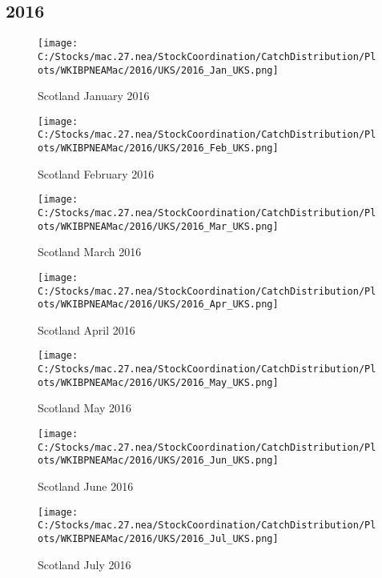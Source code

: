 \documentclass{article}
\begin{document}
\subsection{2016}



\begin{figure}[h]
	\centering
		\texttt{[image: C:/Stocks/mac.27.nea/StockCoordination/CatchDistribution/Plots/WKIBPNEAMac/2016/UKS/2016\_Jan\_UKS.png]}
	\caption{Scotland January 2016}
	\label{fig:2016_Jan_UKS}
\end{figure}

\begin{figure}
	\centering
		\texttt{[image: C:/Stocks/mac.27.nea/StockCoordination/CatchDistribution/Plots/WKIBPNEAMac/2016/UKS/2016\_Feb\_UKS.png]}
	\caption{Scotland February 2016}
	\label{fig:2016_Feb_UKS}
\end{figure}

\begin{figure}
	\centering
		\texttt{[image: C:/Stocks/mac.27.nea/StockCoordination/CatchDistribution/Plots/WKIBPNEAMac/2016/UKS/2016\_Mar\_UKS.png]}
	\caption{Scotland March 2016}
	\label{fig:2016_Mar_UKS}
\end{figure}

\begin{figure}
	\centering
		\texttt{[image: C:/Stocks/mac.27.nea/StockCoordination/CatchDistribution/Plots/WKIBPNEAMac/2016/UKS/2016\_Apr\_UKS.png]}
	\caption{Scotland April 2016}
	\label{fig:2016_Apr_UKS}
\end{figure}

\begin{figure}
	\centering
		\texttt{[image: C:/Stocks/mac.27.nea/StockCoordination/CatchDistribution/Plots/WKIBPNEAMac/2016/UKS/2016\_May\_UKS.png]}
	\caption{Scotland May 2016}
	\label{fig:2016_May_UKS}
\end{figure}

\begin{figure}
	\centering
		\texttt{[image: C:/Stocks/mac.27.nea/StockCoordination/CatchDistribution/Plots/WKIBPNEAMac/2016/UKS/2016\_Jun\_UKS.png]}
	\caption{Scotland June 2016}
	\label{fig:2016_Jun_UKS}
\end{figure}

\begin{figure}
	\centering
		\texttt{[image: C:/Stocks/mac.27.nea/StockCoordination/CatchDistribution/Plots/WKIBPNEAMac/2016/UKS/2016\_Jul\_UKS.png]}
	\caption{Scotland July 2016}
	\label{fig:2016_Jul_UKS}
\end{figure}
\end{document}
